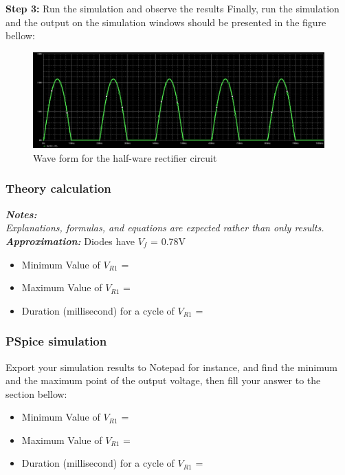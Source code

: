 \textbf{Step 3: } Run the simulation and observe the results
Finally, run the simulation and the output on the simulation windows should be presented in  the figure bellow:

\begin{figure}[!htp]
    \label{pic:halfwave_rectifier6}
    \centering
    \includegraphics[width = 5in]{source/picture/bai_2/diode_9.PNG}
    \caption{Wave form for the half-ware rectifier circuit}
    \label{lab02_ex031h}
\end{figure}



\subsubsection{Theory calculation}
\textit{\textbf{Notes:}}\\
\textit{Explanations, formulas, and equations are expected rather than only results.}\\

\textbf{\textit{Approximation:}} Diodes have $V_f$ = 0.78V\\
\begin{itemize}
    \item Minimum Value of $V_{R1}$ = \dotfill\\
    \item Maximum Value of $V_{R1}$ = \dotfill\\
    \item Duration (millisecond) for a cycle of $V_{R1}$ = \dotfill\\
\end{itemize}

\subsubsection{PSpice simulation}
Export your simulation results to Notepad for instance, and find the minimum and the maximum point of the output voltage, then fill your answer to the section bellow:

\begin{itemize}
    \item Minimum Value of $V_{R1}$ = \dotfill\\
    \item Maximum Value of $V_{R1}$ = \dotfill\\
    \item Duration (millisecond) for a cycle of $V_{R1}$ = \dotfill\\
\end{itemize}

